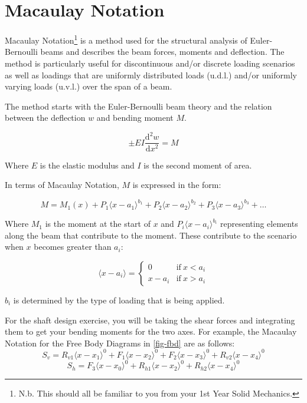 
\section{Macaulay Notation}

Macaulay Notation\footnote{N.b. This should all be familiar to you from your 1st Year Solid Mechanics.} is a method used for the structural analysis of Euler-Bernoulli beams and describes the beam forces, moments and deflection. The method is particularly useful for discontinuous and/or discrete loading scenarios as well as loadings that are uniformly distributed loads (u.d.l.) and/or uniformly varying loads (u.v.l.) over the span of a beam.

The method starts with the Euler-Bernoulli beam theory and the relation between the deflection $w$ and bending moment $M$.

\begin{equation}
  \pm EI\frac{\text{d}^2 w}{\text{d}x^2} = M
\end{equation}

\noindent Where $E$ is the elastic modulus and $I$ is the second moment of area.

In terms of Macaulay Notation, $M$ is expressed in the form:

\begin{equation}
  M = M_1(x) + P_1\langle x-a_1\rangle^{b_1} + P_2\langle x-a_2\rangle^{b_2} + P_3\langle x-a_3\rangle^{b_3} + \ldots
\end{equation}

\noindent Where $M_1$ is the moment at the start of $x$ and $P_i\langle x-a_i\rangle^{b_i}$ representing elements along the beam that contribute to the moment. These contribute to the scenario when $x$ becomes greater than $a_i$:

\begin{equation}
  \langle x - a_i\rangle = 
  \begin{cases} 
    0 & \mathrm{if}~ x < a_i \\ 
    x - a_i & \mathrm{if}~ x > a_i 
  \end{cases}
\end{equation}

\noindent $b_i$ is determined by the type of loading that is being applied. 

For the shaft design exercise, you will be taking the shear forces and integrating them to get your bending moments for the two axes. For example, the Macaulay Notation for the Free Body Diagrams in \cref{fig-fbd} are as follows:
\begin{equation}
  S_v = R_{v1}\langle x-x_1\rangle^0 + F_{1}\langle x-x_2\rangle^0  + F_{2}\langle x-x_3\rangle^0 + R_{v2}\langle x-x_4\rangle^0
\end{equation}
\begin{equation}
  S_h = F_{3}\langle x-x_0\rangle^0 + R_{h1}\langle x-x_2\rangle^0 + R_{h2}\langle x-x_4\rangle^0
\end{equation}

